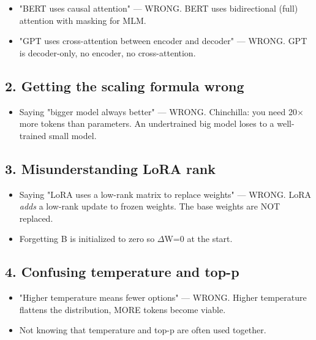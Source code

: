 \documentclass[11pt]{article}
\providecommand{\tightlist}{\setlength{\itemsep}{1pt}\setlength{\parskip}{0pt}}
\begin{document}
\begin{itemize}
\tightlist
\item
  "BERT uses causal attention" --- WRONG. BERT uses bidirectional (full) attention with masking for MLM.
\item
  "GPT uses cross-attention between encoder and decoder" --- WRONG. GPT is decoder-only, no encoder, no cross-attention.
\end{itemize}

\subsection{2. Getting the scaling formula wrong}\label{2-getting-the-scaling-formula-wrong}

\begin{itemize}
\tightlist
\item
  Saying "bigger model always better" --- WRONG. Chinchilla: you need 20\(\times\) more tokens than parameters. An undertrained big model loses to a well-trained small model.
\end{itemize}

\subsection{3. Misunderstanding LoRA rank}\label{3-misunderstanding-lora-rank}

\begin{itemize}
\tightlist
\item
  Saying "LoRA uses a low-rank matrix to replace weights" --- WRONG. LoRA \emph{adds} a low-rank update to frozen weights. The base weights are NOT replaced.
\item
  Forgetting B is initialized to zero so \(\Delta\)W=0 at the start.
\end{itemize}

\subsection{4. Confusing temperature and top-p}\label{4-confusing-temperature-and-top-p}

\begin{itemize}
\tightlist
\item
  "Higher temperature means fewer options" --- WRONG. Higher temperature flattens the distribution, MORE tokens become viable.
\item
  Not knowing that temperature and top-p are often used together.
\end{itemize}
\end{document}
